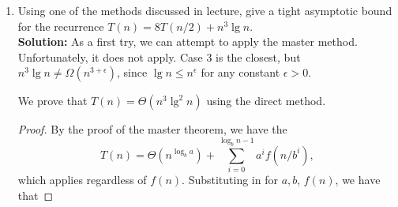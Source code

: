 \documentclass[letterpaper,11pt]{article}
\begin{document}
\begin{enumerate}
\begin{enumerate}
$n^{\log_ba} = n^{\log_{2}7}$ and $f(n) = n^2 = O(n^{\log_27-\epsilon})$ for $0 < \epsilon \leq \lg_27 - 2$.

\item $T(n) = 2T(n/4) = \sqrt{n}$.\\

By case 2 of the Master Theorem $T(n) = \Theta(\sqrt{n}\lg n)$.

$n^{\log_ba} = n^{\log_{4}2} = \sqrt{n}$ and $f(n) = \sqrt{n} = \Theta(\sqrt{n})$.

\item $T(n) = T(n-2) + n^2$.\\

We show that $T(n) = \Theta(n^3)$ via the direct method.
\begin{proof}
\begin{align*}
T(n) &= T(n-2) + n^2\\
     &= T(n-4) + (n-2)^2 + n^2\\
     &= T(n-6) + (n-4)^2 + (n-2)^2 + n^2\\
     &= T(n-2(i+1)) + (n-2i)^2 + \cdots + n^2\\
     &= \Theta(1) + \sum_{i=0}^{n/2-1}(n-2i)^2\\
     &= \Theta(1) + \sum_{i=0}^{n/2-1}(n^2 - 4ni + 4i^2)\\
     &= \Theta(1) + \sum_{i=0}^{n/2-1}n^2 - \sum_{i=0}^{n/2-1}4ni + 4\sum_{i=0}^{n/2-1}4i^2\\
     &=\Theta(1) + n^3/2 - 4n\frac{(n/2-1)(n/2)}{2} + 4\frac{(n/2)(n/2 - 1)(n-1)}{6}\\
     &=\Theta(1) + n^3/2 - n^3/2 - \Theta(n^2) + n^3/6 + \Theta(n^2)\\
     &=\Theta(n^3).
\end{align*}%
\end{proof}

\end{enumerate}

\newpage

\item Using one of the methods discussed in lecture, give a tight asymptotic bound for the recurrence $T(n) = 8T(n/2) + n^3 \lg n$.\\

{\bf Solution:} As a first try, we can attempt to apply the master method. Unfortunately, it does not apply. Case 3 is the closest, but $n^3\lg n \neq \Omega(n^{3+\epsilon})$, since $\lg n \leq n^\epsilon$ for any constant $\epsilon > 0$.

We prove that $T(n) = \Theta(n^3\lg^2 n)$ using the direct method.
\begin{proof}
By the proof of the master theorem, we have the \[T(n) = \Theta(n^{\log_b a}) + \sum_{i=0}^{\log_b n-1}a^if(n/b^i),\]
which applies regardless of $f(n)$. Substituting in for $a,b$, $f(n)$, we have that 


\end{proof}
\end{enumerate}
\end{document}
